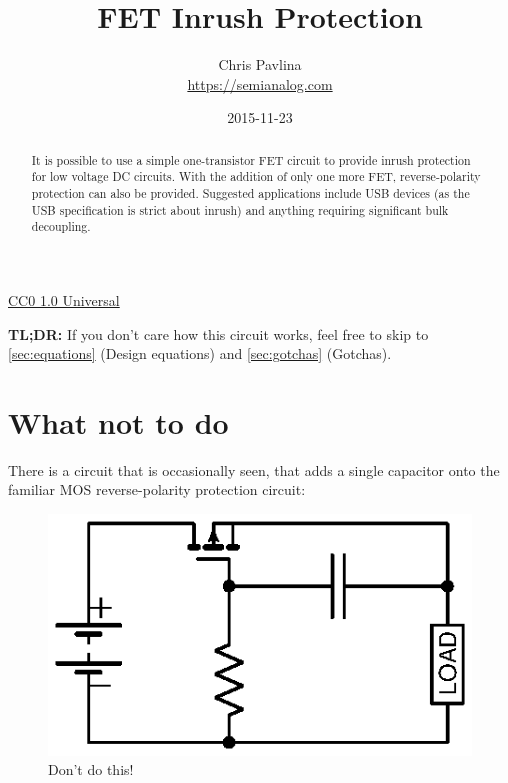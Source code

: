 \documentclass[letterpaper,12pt]{article}
\title{FET Inrush Protection}
\author{Chris Pavlina \\ \small \url{https://semianalog.com}}
\date{2015-11-23}
\begin{document}
\maketitle

\begin{center}
    \href{https://creativecommons.org/publicdomain/zero/1.0/}{CC0 1.0 Universal}
\end{center}

\begin{abstract}
It is possible to use a simple one-transistor FET circuit to provide
inrush protection for low voltage DC circuits. With the addition of
only one more FET, reverse-polarity protection can also be provided.
Suggested applications include USB devices (as the USB specification
is strict about inrush) and anything requiring significant bulk
decoupling.
\end{abstract}

\begin{framed}
\textbf{TL;DR:} If you don't care how this circuit works, feel free to
skip to \cref{sec:equations} (Design equations) and \cref{sec:gotchas} (Gotchas).
\end{framed}

\tableofcontents

\section{What not to do}
\label{sec:bad}

There is a circuit that is occasionally seen\cite{elecdesign_rpp}, that adds a single capacitor
onto the familiar MOS reverse-polarity protection circuit:

\begin{figure}[H]
\centering
\includegraphics{what_not_to_do_1}
\caption{Don't do this!}
\end{figure}
\end{document}

